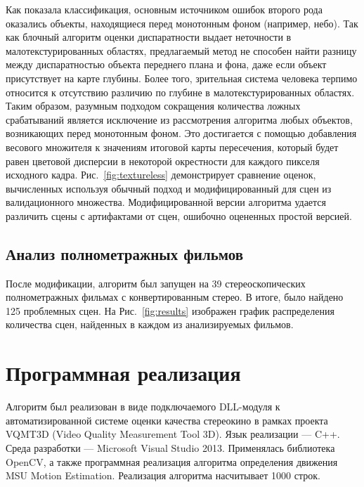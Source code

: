\documentclass[14pt, a4paper]{extarticle}
\begin{document}


Как показала классификация, основным источником ошибок второго рода оказались
объекты, находящиеся перед монотонным фоном (например, небо). Так как блочный
алгоритм оценки диспаратности выдает неточности в малотекстурированных 
областях, предлагаемый метод не способен найти разницу между диспаратностью
объекта переднего плана и фона, даже если объект присутствует на карте глубины.
Более того, зрительная система человека терпимо относится к отсутствию различию
по глубине в малотекстурированных областях. Таким образом, разумным подходом
сокращения количества ложных срабатываний  является исключение из рассмотрения
алгоритма любых объектов, возникающих перед монотонным фоном. Это достигается
с помощью добавления весового множителя к значениям итоговой карты пересечения,
который будет равен цветовой дисперсии в некоторой окрестности для
каждого пикселя исходного кадра. Рис.~\ref{fig:textureless} демонстрирует
сравнение оценок, вычисленных используя обычный подход и модифицированный 
для сцен из валидационного множества. Модифицированной версии алгоритма удается
различить сцены с артифактами от сцен, ошибочно оцененных простой версией.

\subsection{Анализ полнометражных фильмов}



После модификации, алгоритм был запущен на 39 стереоскопических полнометражных
фильмах с конвертированным стерео. В итоге, было найдено 125 проблемных сцен. 
На Рис.~\ref{fig:results} изображен график распределения количества сцен, 
найденных в каждом из анализируемых фильмов.



\newpage
\newpage
\newpage
\clearpage
\section{Программная реализация}

Алгоритм был реализован в виде подключаемого DLL-модуля к автоматизированной 
системе оценки качества стереокино в рамках проекта VQMT3D 
(Video Quality Measurement Tool 3D). Язык реализации --- C++. Среда разработки --- 
Microsoft Visual Studio 2013. Применялась библиотека OpenCV, а также программная 
реализация алгоритма определения движения MSU Motion Estimation. 
Реализация алгоритма насчитывает 1000 строк. 
\end{document}
